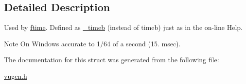 \subsection{Detailed Description}
Used by \hyperlink{group__time_gafc0d3a1676a915f3cedcad79759f6802}{ftime}. Defined as \hyperlink{struct__timeb}{\-\_\-timeb} (instead of timeb) just as in the on-\/line Help. 

\begin{DoxyNote}{Note}
On Windows accurate to 1/64 of a second (15. msec). 
\end{DoxyNote}


The documentation for this struct was generated from the following file\-:\begin{DoxyCompactItemize}
\item 
\hyperlink{vugen_8h}{vugen.\-h}\end{DoxyCompactItemize}
